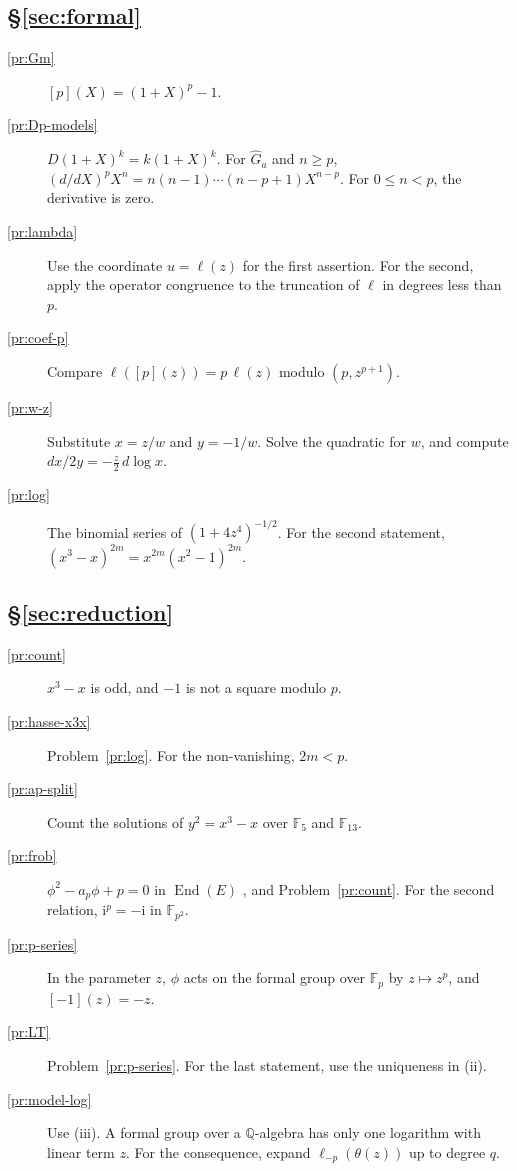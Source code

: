 \documentclass[reqno]{amsart}
\theoremstyle{definition}
\theoremstyle{plain}
\newcommand{\Q}{\mathbb{Q}}
\newcommand{\F}{\mathbb{F}}
\newcommand{\ii}{\mathrm{i}}
\newcommand{\End}{\operatorname{End}}
\begin{document}
\subsection*{\S\ref{sec:formal}}
\begin{description}
\item[\ref{pr:Gm}] \([p](X) = (1+X)^p - 1\).
\item[\ref{pr:Dp-models}] \(D(1+X)^k = k(1+X)^k\).  For \(\hat G_a\) and \(n\ge p\), \((d/dX)^p X^n = n(n-1)\dotsm(n-p+1)X^{n-p}\).  For \(0\le n<p\), the derivative is zero.
\item[\ref{pr:lambda}] Use the coordinate \(u=\ell(z)\) for the first assertion.  For the second, apply the operator congruence to the truncation of \(\ell\) in degrees less than \(p\).
\item[\ref{pr:coef-p}] Compare \(\ell([p](z)) = p\,\ell(z)\) modulo \((p, z^{p+1})\).
\item[\ref{pr:w-z}] Substitute \(x = z/w\) and \(y = -1/w\).  Solve the quadratic for \(w\), and compute \(dx/2y = -\tfrac{z}{2}\, d\log x\).
\item[\ref{pr:log}] The binomial series of \((1 + 4z^4)^{-1/2}\).  For the second statement, \((x^3 - x)^{2m} = x^{2m}(x^2 - 1)^{2m}\).
\end{description}

\subsection*{\S\ref{sec:reduction}}
\begin{description}
\item[\ref{pr:count}] \(x^3 - x\) is odd, and \(-1\) is not a square modulo \(p\).
\item[\ref{pr:hasse-x3x}] Problem~\ref{pr:log}.  For the non-vanishing, \(2m < p\).
\item[\ref{pr:ap-split}] Count the solutions of \(y^2 = x^3 - x\) over \(\F_5\) and \(\F_{13}\).
\item[\ref{pr:frob}] \(\phi^2 - a_p\phi + p = 0\) in \(\End(E)\) \cite[\S V.2]{Si1}, and Problem~\ref{pr:count}.  For the second relation, \(\ii^p = -\ii\) in \(\F_{p^2}\).
\item[\ref{pr:p-series}] In the parameter \(z\), \(\phi\) acts on the formal group over \(\F_p\) by \(z \mapsto z^p\), and \([-1](z) = -z\).
\item[\ref{pr:LT}] Problem~\ref{pr:p-series}.  For the last statement, use the uniqueness in (ii).
\item[\ref{pr:model-log}] Use (iii).  A formal group over a \(\Q\)-algebra has only one logarithm with linear term \(z\).  For the consequence, expand \(\ell_{-p}(\theta(z))\) up to degree \(q\).
\end{description}
\end{document}
